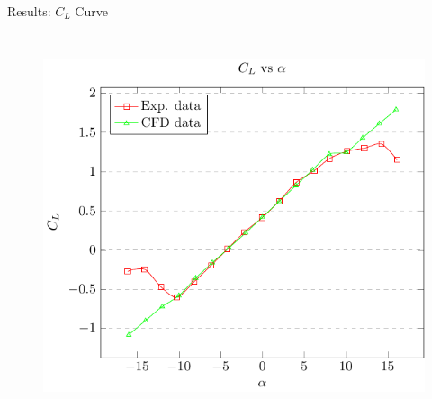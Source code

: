 \documentclass[english,10pt,a4paper,twoside]{beamer}
\begin{document}
\begin{frame}[shrink = 65]{Results: $C_L$ Curve}
\begin{columns}[T]
		\begin{figure}[H]
			\centering
			\includegraphics[width=0.8\linewidth]{figures/non-linear_zone}
			\label{fig:non-linearzone}
		\end{figure}	
	\end{columns}	
	\end{frame}
	
\end{document}
